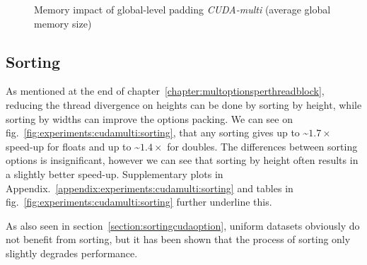 \begin{figure}[H]
\begin{subfigure}{.49\textwidth}
\end{subfigure}
\begin{center}
  \small
\end{center}
\begin{center}
  \small
\end{center}
\caption{Memory impact of global-level padding \textit{CUDA-multi} (average global memory size)}
\label{fig:experiments:cudamulti:globalpadding}
\end{figure}

\newpage
\subsection{Sorting}
As mentioned at the end of chapter~\ref{chapter:multoptionsperthreadblock}, reducing the thread divergence on heights can be done by sorting by height, while sorting by widths can improve the options packing. We can see on fig.~\ref{fig:experiments:cudamulti:sorting}, that any sorting gives up to \textasciitilde$1.7\times$ speed-up for floats and up to \textasciitilde$1.4\times$ for doubles. The differences between sorting options is insignificant, however we can see that sorting by height often results in a slightly better speed-up. Supplementary plots in Appendix.~\ref{appendix:experiments:cudamulti:sorting} and tables in fig.~\ref{fig:experiments:cudamulti:sorting} further underline this.

As also seen in section~\ref{section:sortingcudaoption}, uniform datasets obviously do not benefit from sorting, but it has been shown that the process of sorting only slightly degrades performance.  

